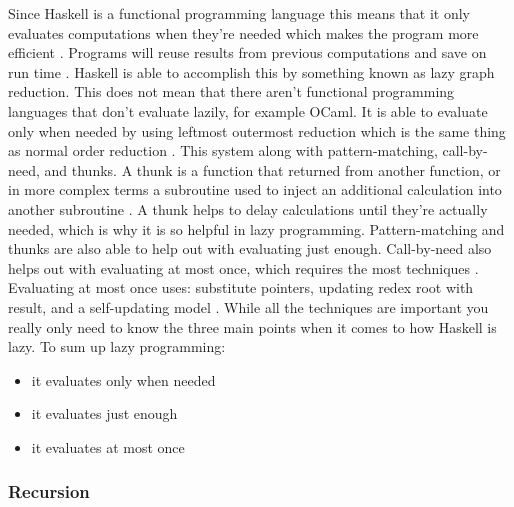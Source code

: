 \documentclass{article}
\begin{document}
Since Haskell is a functional programming language this means that it only evaluates computations when they're needed which makes the program more efficient \cite{WFP}. Programs will reuse results from previous computations and save on run time \cite{WFP}. Haskell is able to accomplish this by something known as lazy graph reduction. This does not mean that there aren't functional programming languages that don't evaluate lazily, for example OCaml. It is able to evaluate only when needed by using leftmost outermost reduction which is the same thing as normal order reduction \cite{CSE}. This system along with pattern-matching, call-by-need, and thunks. A thunk is a function that returned from another function, or in more complex terms a subroutine used to inject an additional calculation into another subroutine \cite{WT}. A thunk helps to delay calculations until they're actually needed, which is why it is so helpful in lazy programming. Pattern-matching and thunks are also able to help out with evaluating just enough. Call-by-need also helps out with evaluating at most once, which requires the most techniques \cite{LEI}. Evaluating at most once uses: substitute pointers, updating redex root with result, and a self-updating model \cite{LEI}. While all the techniques are important you really only need to know the three main points when it comes to how Haskell is lazy. To sum up lazy programming:

\begin{itemize}

\item it evaluates only when needed

\item it evaluates just enough

\item it evaluates at most once 

\end{itemize}

\subsubsection{Recursion}
\end{document}
